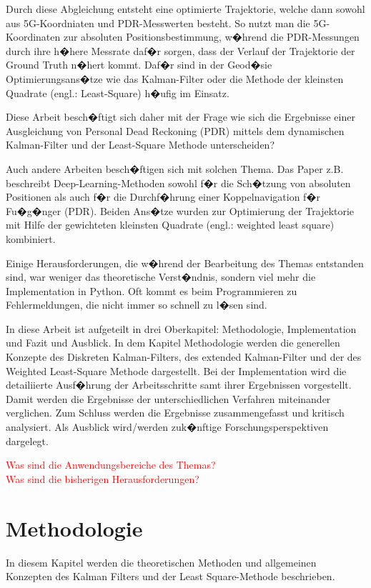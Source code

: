 Durch diese Abgleichung entsteht eine optimierte Trajektorie, welche dann sowohl aus 5G-Koordniaten und PDR-Messwerten besteht. So nutzt man die 5G-Koordinaten zur absoluten Positionsbestimmung, w�hrend die PDR-Messungen durch ihre h�here Messrate daf�r sorgen, dass der Verlauf der Trajektorie der Ground Truth n�hert kommt. Daf�r sind in der Geod�sie Optimierungsans�tze wie das Kalman-Filter oder die Methode der kleinsten Quadrate (engl.: Least-Square) h�ufig im Einsatz.

Diese Arbeit besch�ftigt sich daher mit der Frage wie sich die Ergebnisse einer Ausgleichung von Personal Dead Reckoning (PDR) mittels dem dynamischen Kalman-Filter und der Least-Square Methode unterscheiden?

Auch andere Arbeiten besch�ftigen sich mit solchen Thema. Das Paper \textcite{kjellson2021} z.B. beschreibt Deep-Learning-Methoden sowohl f�r die Sch�tzung von absoluten Positionen als auch f�r die Durchf�hrung einer Koppelnavigation f�r Fu�g�nger (PDR). Beiden Ans�tze wurden zur Optimierung der Trajektorie mit Hilfe der gewichteten kleinsten Quadrate (engl.: weighted least square) kombiniert.

Einige Herausforderungen, die w�hrend der Bearbeitung des Themas entstanden sind, war weniger das theoretische Verst�ndnis, sondern viel mehr die Implementation in Python. Oft kommt es beim Programmieren zu Fehlermeldungen, die nicht immer so schnell zu l�sen sind. 

In diese Arbeit ist aufgeteilt in drei Oberkapitel: Methodologie, Implementation und Fazit und Ausblick. In dem Kapitel Methodologie werden die generellen Konzepte des Diskreten Kalman-Filters, des extended Kalman-Filter und der des Weighted Least-Square Methode dargestellt. Bei der Implementation wird die detailiierte Ausf�hrung der Arbeitsschritte samt ihrer Ergebnissen vorgestellt. Damit werden die Ergebnisse der unterschiedlichen Verfahren miteinander verglichen. Zum Schluss werden die Ergebnisse zusammengefasst und kritisch analysiert. Als Ausblick wird/werden zuk�nftige Forschungsperspektiven dargelegt. 

\textcolor{red}{Was sind die Anwendungsbereiche des Themas?\\Was sind die bisherigen Herausforderungen?}

\section{Methodologie}
In diesem Kapitel werden die theoretischen Methoden und allgemeinen Konzepten des Kalman Filters und der Least Square-Methode beschrieben. 

